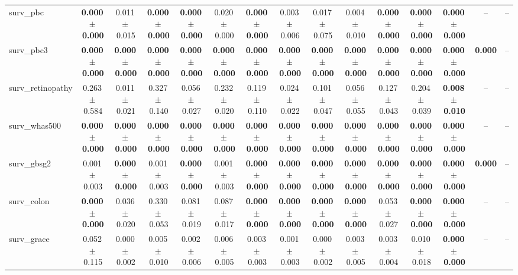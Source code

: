 \documentclass[8pt]{extarticle}
\begin{document}
\begin{longtable}{l*{14}{c}}
surv\_pbc & \textbf{0.000\,$\pm$\,0.000} & 0.011\,$\pm$\,0.015 & \textbf{0.000\,$\pm$\,0.000} & \textbf{0.000\,$\pm$\,0.000} & 0.020\,$\pm$\,0.000 & \textbf{0.000\,$\pm$\,0.000} & 0.003\,$\pm$\,0.006 & 0.017\,$\pm$\,0.075 & 0.004\,$\pm$\,0.010 & \textbf{0.000\,$\pm$\,0.000} & \textbf{0.000\,$\pm$\,0.000} & \textbf{0.000\,$\pm$\,0.000} & -- & -- \\
surv\_pbc3 & \textbf{0.000\,$\pm$\,0.000} & \textbf{0.000\,$\pm$\,0.000} & \textbf{0.000\,$\pm$\,0.000} & \textbf{0.000\,$\pm$\,0.000} & \textbf{0.000\,$\pm$\,0.000} & \textbf{0.000\,$\pm$\,0.000} & \textbf{0.000\,$\pm$\,0.000} & \textbf{0.000\,$\pm$\,0.000} & \textbf{0.000\,$\pm$\,0.000} & \textbf{0.000\,$\pm$\,0.000} & \textbf{0.000\,$\pm$\,0.000} & \textbf{0.000\,$\pm$\,0.000} & \textbf{0.000} & -- \\
surv\_retinopathy & 0.263\,$\pm$\,0.584 & 0.011\,$\pm$\,0.021 & 0.327\,$\pm$\,0.140 & 0.056\,$\pm$\,0.027 & 0.232\,$\pm$\,0.020 & 0.119\,$\pm$\,0.110 & 0.024\,$\pm$\,0.022 & 0.101\,$\pm$\,0.047 & 0.056\,$\pm$\,0.055 & 0.127\,$\pm$\,0.043 & 0.204\,$\pm$\,0.039 & \textbf{0.008\,$\pm$\,0.010} & -- & -- \\
surv\_whas500 & \textbf{0.000\,$\pm$\,0.000} & \textbf{0.000\,$\pm$\,0.000} & \textbf{0.000\,$\pm$\,0.000} & \textbf{0.000\,$\pm$\,0.000} & \textbf{0.000\,$\pm$\,0.000} & \textbf{0.000\,$\pm$\,0.000} & \textbf{0.000\,$\pm$\,0.000} & \textbf{0.000\,$\pm$\,0.000} & \textbf{0.000\,$\pm$\,0.000} & \textbf{0.000\,$\pm$\,0.000} & \textbf{0.000\,$\pm$\,0.000} & \textbf{0.000\,$\pm$\,0.000} & -- & -- \\
surv\_gbsg2 & 0.001\,$\pm$\,0.003 & \textbf{0.000\,$\pm$\,0.000} & 0.001\,$\pm$\,0.003 & \textbf{0.000\,$\pm$\,0.000} & 0.001\,$\pm$\,0.003 & \textbf{0.000\,$\pm$\,0.000} & \textbf{0.000\,$\pm$\,0.000} & \textbf{0.000\,$\pm$\,0.000} & \textbf{0.000\,$\pm$\,0.000} & \textbf{0.000\,$\pm$\,0.000} & \textbf{0.000\,$\pm$\,0.000} & \textbf{0.000\,$\pm$\,0.000} & \textbf{0.000} & -- \\
surv\_colon & \textbf{0.000\,$\pm$\,0.000} & 0.036\,$\pm$\,0.020 & 0.330\,$\pm$\,0.053 & 0.081\,$\pm$\,0.019 & 0.087\,$\pm$\,0.017 & \textbf{0.000\,$\pm$\,0.000} & \textbf{0.000\,$\pm$\,0.000} & \textbf{0.000\,$\pm$\,0.000} & \textbf{0.000\,$\pm$\,0.000} & 0.053\,$\pm$\,0.027 & \textbf{0.000\,$\pm$\,0.000} & \textbf{0.000\,$\pm$\,0.000} & -- & -- \\
surv\_grace & 0.052\,$\pm$\,0.115 & 0.000\,$\pm$\,0.002 & 0.005\,$\pm$\,0.010 & 0.002\,$\pm$\,0.006 & 0.006\,$\pm$\,0.005 & 0.003\,$\pm$\,0.003 & 0.001\,$\pm$\,0.003 & 0.000\,$\pm$\,0.002 & 0.003\,$\pm$\,0.005 & 0.003\,$\pm$\,0.004 & 0.010\,$\pm$\,0.018 & \textbf{0.000\,$\pm$\,0.000} & -- & -- \\

\end{longtable}
\end{document}
